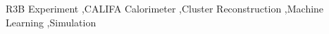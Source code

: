 \documentclass[review,sort&compress]{elsarticle}
\begin{document}
\begin{frontmatter}


\begin{keyword}
R3B Experiment \sep CALIFA Calorimeter \sep Cluster Reconstruction \sep Machine Learning \sep Simulation



\end{keyword}


\end{frontmatter}



\end{document}
